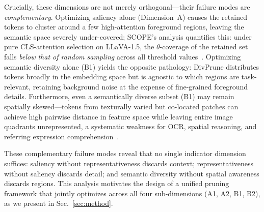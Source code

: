 Crucially, these dimensions are not merely orthogonal---their failure modes are \emph{complementary}.
Optimizing saliency alone (Dimension~A) causes the retained tokens to cluster around a few high-attention foreground regions, leaving the semantic space severely under-covered; SCOPE's analysis quantifies this: under pure CLS-attention selection on LLaVA-1.5, the $\theta$-coverage of the retained set falls \emph{below that of random sampling} across all threshold values~\cite{scope}.
Optimizing semantic diversity alone (B1) yields the opposite pathology: DivPrune distributes tokens broadly in the embedding space but is agnostic to which regions are task-relevant, retaining background noise at the expense of fine-grained foreground details.
Furthermore, even a semantically diverse subset (B1) may remain spatially skewed---tokens from texturally varied but co-located patches can achieve high pairwise distance in feature space while leaving entire image quadrants unrepresented, a systematic weakness for OCR, spatial reasoning, and referring expression comprehension~\cite{nuwa}.

These complementary failure modes reveal that no single indicator dimension suffices: saliency without representativeness discards context; representativeness without saliency discards detail; and semantic diversity without spatial awareness discards regions.
This analysis motivates the design of a unified pruning framework that jointly optimizes across all four sub-dimensions (A1, A2, B1, B2), as we present in Sec.~\ref{sec:method}.
